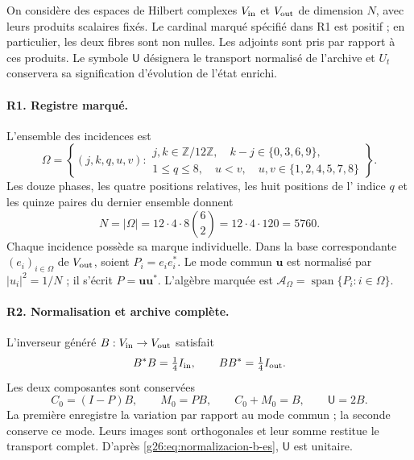 On considère des espaces de Hilbert complexes \(V_{\rm in}\) et
\(V_{\rm out}\) de dimension \(N\), avec leurs produits scalaires fixés.
Le cardinal marqué spécifié dans R1 est positif ; en particulier,
les deux fibres sont non nulles. Les adjoints sont pris par rapport à ces produits. Le symbole
\(\mathsf U\) désignera le transport normalisé de l'archive et
\(U_t\) conservera sa signification d'évolution de l'état enrichi.

\paragraph{R1. Registre marqué.}
L'ensemble des incidences est
\begin{equation}
 \Omega=\left\{(j,k,q,u,v):
 \begin{array}{l}
 j,k\in\mathbb Z/12\mathbb Z,\quad k-j\in\{0,3,6,9\},\\
 1\leq q\leq8,\quad u<v,\quad
 u,v\in\{1,2,4,5,7,8\}
 \end{array}\right\}.
 \label{g26:eq:omega-rigidez-es}
\end{equation}
Les douze phases, les quatre positions relatives, les huit positions de l'
indice \(q\) et les quinze paires du dernier ensemble donnent
\begin{equation}
 N=|\Omega|=12\cdot4\cdot8\binom62
   =12\cdot4\cdot120=5760.
 \label{g26:eq:cardinal-rigidez-es}
\end{equation}
Chaque incidence possède sa marque individuelle. Dans la base correspondante \((e_i)_{i\in\Omega}\) de \(V_{\rm out}\), soient \(P_i=e_ie_i^*\). Le mode commun \(\boldsymbol u\) est normalisé par \(|u_i|^2=1/N\) ; il s'écrit \(P=\boldsymbol u\boldsymbol u^*\). L'algèbre marquée est \(\mathcal A_\Omega=\operatorname{span}\{P_i:i\in\Omega\}\).

\paragraph{R2. Normalisation et archive complète.}
L'inverseur généré \(B:V_{\rm in}\to V_{\rm out}\) satisfait
\begin{equation}
 B^*B=\tfrac14 I_{\rm in},\qquad
 BB^*=\tfrac14 I_{\rm out}.
 \label{g26:eq:normalizacion-b-es}
\end{equation}
Les deux composantes sont conservées
\begin{equation}
 C_0=(I-P)B,\qquad M_0=PB,\qquad
 C_0+M_0=B,\qquad \mathsf U=2B.
 \label{g26:eq:archivo-completo-es}
\end{equation}
La première enregistre la variation par rapport au mode commun ; la seconde
conserve ce mode. Leurs images sont orthogonales et leur somme restitue
le transport complet. D'après \eqref{g26:eq:normalizacion-b-es},
\(\mathsf U\) est unitaire.

